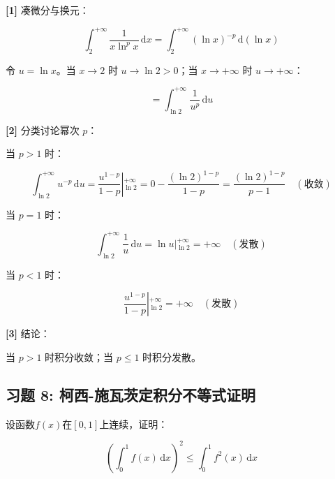 \documentclass[11pt,a4paper,UTF8]{ctexart}
\begin{document}
\begin{solbox}[分步推导与答题规范]
\textbf{[1]} 凑微分与换元：


\begin{equation*}
\int_2^{+\infty} \frac{1}{x \ln^p x}\,\mathrm{d}x = \int_2^{+\infty} (\ln x)^{-p}\,\mathrm{d}(\ln x)
\end{equation*}


令 $u = \ln x$。当 $x \to 2$ 时 $u \to \ln 2 > 0$；当 $x \to +\infty$ 时 $u \to +\infty$：


\begin{equation*}
= \int_{\ln 2}^{+\infty} \frac{1}{u^p}\,\mathrm{d}u
\end{equation*}


\textbf{[2]} 分类讨论幂次 $p$：

当 $p > 1$ 时：


\begin{equation*}
\int_{\ln 2}^{+\infty} u^{-p}\,\mathrm{d}u = \left. \frac{u^{1-p}}{1-p} \right\vert{}_{\ln 2}^{+\infty} = 0 - \frac{(\ln 2)^{1-p}}{1-p} = \frac{(\ln 2)^{1-p}}{p-1} \quad (\text{收敛})
\end{equation*}


当 $p = 1$ 时：


\begin{equation*}
\int_{\ln 2}^{+\infty} \frac{1}{u}\,\mathrm{d}u = \left. \ln u \right\vert{}_{\ln 2}^{+\infty} = +\infty \quad (\text{发散})
\end{equation*}


当 $p < 1$ 时：


\begin{equation*}
\left. \frac{u^{1-p}}{1-p} \right\vert{}_{\ln 2}^{+\infty} = +\infty \quad (\text{发散})
\end{equation*}


\textbf{[3]} 结论：

当 $p > 1$ 时积分收敛；当 $p \leqslant 1$ 时积分发散。
\end{solbox}


\subsection{习题 8: 柯西-施瓦茨定积分不等式证明}

设函数$f(x)$在$[0, 1]$上连续，证明：


\begin{equation*}
\left(\int_0^1 f(x)\,\mathrm{d}x\right)^2 \le \int_0^1 f^2(x)\,\mathrm{d}x
\end{equation*}
\end{document}
